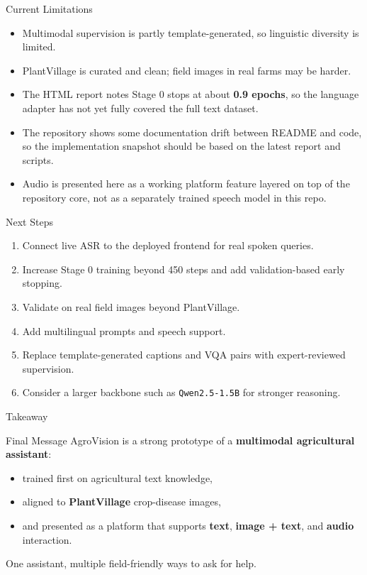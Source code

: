 \documentclass[aspectratio=169,11pt]{beamer}
\begin{document}
\begin{frame}{Current Limitations}
\begin{itemize}
    \item Multimodal supervision is partly template-generated, so linguistic diversity is limited.
    \item PlantVillage is curated and clean; field images in real farms may be harder.
    \item The HTML report notes Stage 0 stops at about \textbf{0.9 epochs}, so the language adapter has not yet fully covered the full text dataset.
    \item The repository shows some documentation drift between README and code, so the implementation snapshot should be based on the latest report and scripts.
    \item Audio is presented here as a working platform feature layered on top of the repository core, not as a separately trained speech model in this repo.
\end{itemize}
\end{frame}

\begin{frame}{Next Steps}
\begin{enumerate}
    \item Connect live ASR to the deployed frontend for real spoken queries.
    \item Increase Stage 0 training beyond 450 steps and add validation-based early stopping.
    \item Validate on real field images beyond PlantVillage.
    \item Add multilingual prompts and speech support.
    \item Replace template-generated captions and VQA pairs with expert-reviewed supervision.
    \item Consider a larger backbone such as \texttt{Qwen2.5-1.5B} for stronger reasoning.
\end{enumerate}
\end{frame}

\begin{frame}{Takeaway}
\begin{block}{Final Message}
AgroVision is a strong prototype of a \textbf{multimodal agricultural assistant}:
\begin{itemize}
    \item trained first on agricultural text knowledge,
    \item aligned to \textbf{PlantVillage} crop-disease images,
    \item and presented as a platform that supports \textbf{text}, \textbf{image + text}, and \textbf{audio} interaction.
\end{itemize}
\end{block}
\vspace{0.5em}
\centering
\Large\textcolor{AgroGreen}{One assistant, multiple field-friendly ways to ask for help.}
\end{frame}
\end{document}

